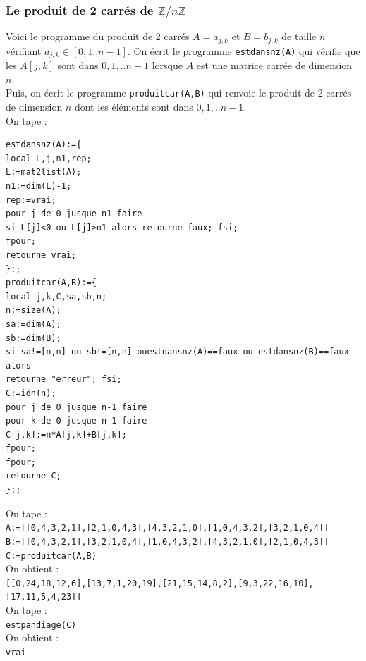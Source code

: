 \documentclass[a4paper,11pt]{book}
\newcommand{\Z}{{\mathbb{Z}}}
\begin{document}
\subsubsection{Le produit de 2 carr\'es de $\Z/n\Z$}
Voici le programme du produit de 2 carr\'es $A=a_{j,k}$ et 
$B=b_{j,k}$ de taille $n$ v\'erifiant $a_{j,k} \in [0,1..n-1]$.
On \'ecrit le programme {\tt estdansnz(A)} qui v\'erifie que les  $A[j,k]$ sont 
dans $0,1,..n-1$ lorsque $A$ est une matrice carr\'ee de dimension $n$.\\
Puis, on \'ecrit le programme {\tt produitcar(A,B)} qui renvoie le produit de 
2 carr\'es de dimension $n$ dont les \'el\'ements sont dans $0,1,..n-1$.\\
On tape :
\begin{verbatim}
estdansnz(A):={
local L,j,n1,rep;
L:=mat2list(A);
n1:=dim(L)-1;
rep:=vrai;
pour j de 0 jusque n1 faire
si L[j]<0 ou L[j]>n1 alors retourne faux; fsi;
fpour;
retourne vrai;
}:;
produitcar(A,B):={
local j,k,C,sa,sb,n;
n:=size(A);
sa:=dim(A);
sb:=dim(B);
si sa!=[n,n] ou sb!=[n,n] ouestdansnz(A)==faux ou estdansnz(B)==faux alors 
retourne "erreur"; fsi;
C:=idn(n); 
pour j de 0 jusque n-1 faire
pour k de 0 jusque n-1 faire
C[j,k]:=n*A[j,k]+B[j,k];
fpour;
fpour;
retourne C;
}:;
\end{verbatim}
On tape :\\
{\tt A:=[[0,4,3,2,1],[2,1,0,4,3],[4,3,2,1,0],[1,0,4,3,2],[3,2,1,0,4]]}\\
{\tt B:=[[0,4,3,2,1],[3,2,1,0,4],[1,0,4,3,2],[4,3,2,1,0],[2,1,0,4,3]]}\\
{\tt C:=produitcar(A,B)}\\
On obtient :\\
{\tt [[0,24,18,12,6],[13,7,1,20,19],[21,15,14,8,2],[9,3,22,16,10],[17,11,5,4,23]]}\\
On tape :\\
{\tt estpandiage(C)}\\
On obtient :\\
{\tt vrai}
\end{document}

